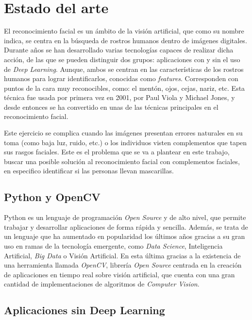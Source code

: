 
\chapter{Estado del arte}

El reconocimiento facial es un ámbito de la visión artificial, que como su nombre indica, se centra en la búsqueda de rostros humanos dentro de imágenes digitales. Durante años se han desarrollado varias tecnologías capaces de realizar dicha acción, de las que se pueden distinguir dos grupos: aplicaciones con y sin el uso de \textit{Deep Learning}. Aunque, ambos se centran en las características de los rostros humanos para lograr identificarlos, conocidas como \textit{features}. Corresponden con puntos de la cara muy reconocibles, como: el mentón, ojos, cejas, nariz, etc. Esta técnica fue usada por primera vez en 2001, por Paul Viola y Michael Jones, y desde entonces se ha convertido en unas de las técnicas principales en el reconocimiento facial.

Este ejercicio se complica cuando las imágenes presentan errores naturales en su toma (como baja luz, ruido, etc.) o los individuos visten complementos que tapen sus rasgos faciales. Este es el problema que se va a plantear en este trabajo, buscar una posible solución al reconocimiento facial con complementos faciales, en especifico identificar si las personas llevan mascarillas.

\section{Python y OpenCV}

Python es un lenguaje de programación \textit{Open Source} y de alto nivel, que permite trabajar y desarrollar aplicaciones de forma rápida y sencilla. Además, se trata de un lenguaje que ha aumentado en popularidad los últimos años gracias a su gran uso en ramas de la tecnología emergente, como \textit{Data Science}, Inteligencia Artificial, \textit{Big Data} o Visión Artificial. En esta última gracias a la existencia de una herramienta llamada \textit{OpenCV}, librería \textit{Open Source} centrada en la creación de aplicaciones en tiempo real sobre visión artificial, que cuenta con una gran cantidad de implementaciones de algoritmos de \textit{Computer Vision}.

\section{Aplicaciones sin Deep Learning}

